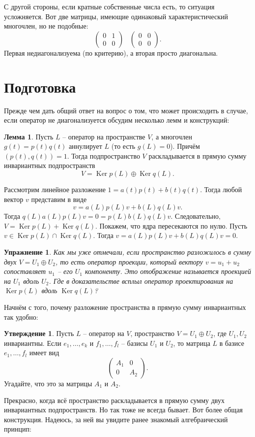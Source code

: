 \documentclass[10pt,a4paper,oneside]{book}
\newtheorem{uprz}{\color{violet!100!black} Упражнение}
\theoremstyle{definition}
\newtheorem{lem}{\color{green!50!black}Лемма}
\newtheorem{utvr}{\color{blue!50!black}Утверждение}
\DeclareMathOperator{\Ker}{Ker}
\def\lm{\begin{lem}}
\def\elm{\end{lem}}
\def\pmat{\begin{pmatrix}}
\def\epmat{\end{pmatrix}}
\def\utv{\begin{utvr}}
\def\eutv{\end{utvr}}
\def\upr{\begin{uprz}}
\def\eupr{\end{uprz}}
\begin{document}
С другой стороны, если кратные собственные числа есть, то ситуация усложняется. Вот две матрицы, имеющие одинаковый характеристический многочлен, но не подобные:
$$\pmat 0&1\\ 0&0 \epmat\,\,\,\,\, \pmat 0&0\\ 0&0 \epmat.$$
Первая недиагонализуема (по критерию), а вторая просто диагональна.


\section{Подготовка}

Прежде чем дать общий ответ на вопрос о том, что может происходить в случае, если оператор не диагонализуется обсудим несколько лемм и конструкций:



\lm Пусть $L$ -- оператор на пространстве $V$, а  многочлен $g(t)=p(t)q(t)$ аннулирует $L$ (то есть $g(L)=0$). Причём $(p(t),q(t))=1$. Тогда подпространство $V$ раскладывается в прямую сумму инвариантных подпространств
$$V = \Ker p(L)\oplus \Ker q(L).$$
\elm
\proof Рассмотрим линейное разложение $1=a(t)p(t)+b(t)q(t)$. Тогда любой вектор $v$  представим в виде
$$v=a(L)p(L)v+ b(L)q(L)v.$$
Тогда $q(L)a(L)p(L)v=0=p(L)b(L)q(L)v$. Следовательно, $V= \Ker p(L)+\Ker q(L)$. Покажем, что ядра пересекаются по нулю. Пусть $v\in \Ker p(L) \cap \Ker q(L)$. Тогда $v=a(L)p(L)v+ b(L)q(L)v=0$.
\endproof

\upr Как мы уже отмечали, если пространство разложилось в сумму двух $V=U_1\oplus U_2$, то есть оператор проекции, который вектору $v=u_1+u_2$ сопоставляет $u_1$ -- его $U_1$ компоненту. Это отображение называется проекцией на $U_1$ вдоль $U_2$.
Где в доказательстве всплыл оператор проектирования на $\Ker p(L)$ вдоль $\Ker q(L)$?
\eupr


Начнём с того, почему разложение пространства в прямую сумму инвариантных так удобно:

\utv Пусть $L$ -- оператор на $V$, пространство $V=U_1\oplus U_2$, где $U_1,U_2$ инвариантны. Если $e_1,\dots,e_k$ и $f_1,\dots,f_l$ -- базисы $U_1$ и $U_2$, то матрица $L$ в базисе $e_1,\dots, f_l$ имеет вид
$$\pmat A_1 & 0 \\ 0 & A_2 \epmat.$$
Угадайте, что это за матрицы $A_1$ и $A_2$.
\eutv




Прекрасно, когда всё пространство раскладывается в прямую сумму двух инвариантных подпространств. Но так тоже не всегда бывает. Вот более общая конструкция. Надеюсь, за ней вы увидите ранее знакомый алгебраический принцип:
\end{document}
